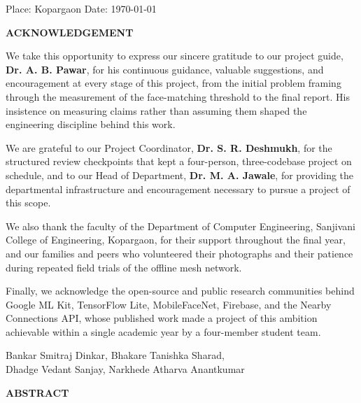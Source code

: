 \documentclass[12pt,a4paper,oneside]{report}
\begin{document}
\vspace{1cm}
\noindent Place: Kopargaon \hfill Date: \today
\vspace*{\fill}

\newpage
\thispagestyle{plain}
\vspace*{\fill}
\begin{center}
{\Large\bfseries ACKNOWLEDGEMENT}
\end{center}
\vspace{0.4cm}

We take this opportunity to express our sincere gratitude to our project
guide, \textbf{Dr. A. B. Pawar}, for his continuous guidance, valuable
suggestions, and encouragement at every stage of this project, from the
initial problem framing through the measurement of the face-matching
threshold to the final report. His insistence on measuring claims rather than
assuming them shaped the engineering discipline behind this work.

We are grateful to our Project Coordinator, \textbf{Dr. S. R. Deshmukh}, for
the structured review checkpoints that kept a four-person, three-codebase
project on schedule, and to our Head of Department, \textbf{Dr. M. A.
Jawale}, for providing the departmental infrastructure and encouragement
necessary to pursue a project of this scope.

We also thank the faculty of the Department of Computer Engineering,
Sanjivani College of Engineering, Kopargaon, for their support throughout the
final year, and our families and peers who volunteered their photographs and
their patience during repeated field trials of the offline mesh network.

Finally, we acknowledge the open-source and public research communities
behind Google ML Kit, TensorFlow Lite, MobileFaceNet, Firebase, and the
Nearby Connections API, whose published work made a project of this ambition
achievable within a single academic year by a four-member student team.

\vspace{1.5cm}
\begin{flushright}
Bankar Smitraj Dinkar, Bhakare Tanishka Sharad,\\
Dhadge Vedant Sanjay, Narkhede Atharva Anantkumar
\end{flushright}
\vspace*{\fill}

\newpage
\thispagestyle{plain}
\begin{center}
{\Large\bfseries ABSTRACT}
\end{center}
\vspace{0.4cm}
\end{document}

